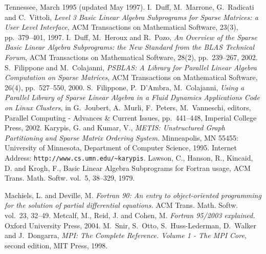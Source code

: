 \documentclass[10pt,a4paper,twoside]{article}
\begin{document}
\begin{thebibliography}{99}
Tennessee, March 1995 (updated May 1997).
%
I.~Duff, M.~Marrone, G.~Radicati and C.~Vittoli,
{\em Level 3 Basic Linear Algebra Subprograms for Sparse Matrices: 
a User Level Interface},
ACM Transactions on Mathematical Software, 23(3), pp.~379--401, 1997.
%
I.~Duff, M.~Heroux and R.~Pozo,
{\em An Overview of the Sparse Basic Linear
Algebra Subprograms: the New Standard from the BLAS Technical Forum},
ACM Transactions on Mathematical Software, 28(2), pp.~239--267, 2002.
S.~Filippone and M.~Colajanni, 
{\em PSBLAS: A Library for Parallel Linear Algebra
Computation on Sparse Matrices},
\newblock
ACM Transactions on Mathematical Software, 26(4), pp.~527--550, 2000.
%
S.~Filippone, P.~D'Ambra, M.~Colajanni,
{\em Using a Parallel Library of Sparse Linear Algebra in a Fluid Dynamics 
Applications Code on Linux Clusters},
in G.~Joubert, A.~Murli, F.~Peters, M.~Vanneschi, editors,
Parallel Computing - Advances \& Current Issues,
pp.~441--448, Imperial College Press, 2002. 
%
Karypis, G. and Kumar, V.,
{\em {METIS}: Unstructured Graph Partitioning and Sparse Matrix
  Ordering System}.
Minneapolis, MN 55455: University of Minnesota, Department of
  Computer Science, 1995. 
Internet Address: {\verb|http://www.cs.umn.edu/~karypis|}.
Lawson, C.,  Hanson, R., Kincaid, D. and Krogh, F.,
   Basic {L}inear {A}lgebra {S}ubprograms for {F}ortran usage,
{ACM Trans. Math. Softw.} vol.~{5}, 38--329, 1979.

{Machiels, L. and Deville, M.}
{\em Fortran 90: An entry to object-oriented programming for the solution
  of partial differential equations.}
{ACM Trans. Math. Softw.} vol.~{23}, 32--49.
{Metcalf, M., Reid, J. and Cohen, M.}
{\em Fortran 95/2003 explained.}
{Oxford University Press}, 2004.
%
%
M.~Snir, S.~Otto, S.~Huss-Lederman, D.~Walker and J.~Dongarra,
{\em MPI: The Complete Reference. Volume 1 - The MPI Core}, second edition,
MIT Press, 1998.
%
\end{thebibliography}
\end{document}
